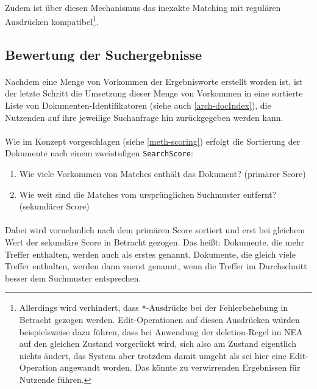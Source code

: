 \paragraph{} Zudem ist über diesen Mechanismus das inexakte Matching mit regulären Ausdrücken kompatibel\footnote{Allerdings wird verhindert, dass \texttt{*}-Ausdrücke bei der Fehlerbehebung in Betracht gezogen werden. Edit-Operationen auf diesen Ausdrücken würden beispielsweise dazu führen, dass bei Anwendung der deletion-Regel im NEA auf den gleichen Zustand vorgerückt wird, sich also am Zustand eigentlich nichts ändert, das System aber trotzdem damit umgeht als sei hier eine Edit-Operation angewandt worden. Das könnte zu verwirrenden Ergebnissen für Nutzende führen.}.

\subsection{Bewertung der Suchergebnisse}
\label{algo-scoring}

\paragraph{} Nachdem eine Menge von Vorkommen der Ergebnisworte erstellt worden ist, ist der letzte Schritt die Umsetzung dieser Menge von Vorkommen in eine sortierte Liste von Dokumenten-Identifikatoren (siehe auch \ref{arch-docIndex}), die Nutzenden auf ihre jeweilige Suchanfrage hin zurückgegeben werden kann.
\paragraph{} Wie im Konzept vorgeschlagen (siehe \ref{meth-scoring}) erfolgt die Sortierung der Dokumente nach einem zweistufigen \texttt{SearchScore}:
\begin{enumerate}
\item Wie viele Vorkommen von Matches enthält das Dokument? (primärer Score)
\item Wie weit sind die Matches vom ursprünglichen Suchmuster entfernt? (sekundärer Score)
\end{enumerate}

\paragraph{} Dabei wird vornehmlich nach dem primären Score sortiert und erst bei gleichem Wert der sekundäre Score in Betracht gezogen. Das heißt: Dokumente, die mehr Treffer enthalten, werden auch als erstes genannt. Dokumente, die gleich viele Treffer enthalten, werden dann zuerst genannt, wenn die Treffer im Durchschnitt besser dem Suchmuster entsprechen.
